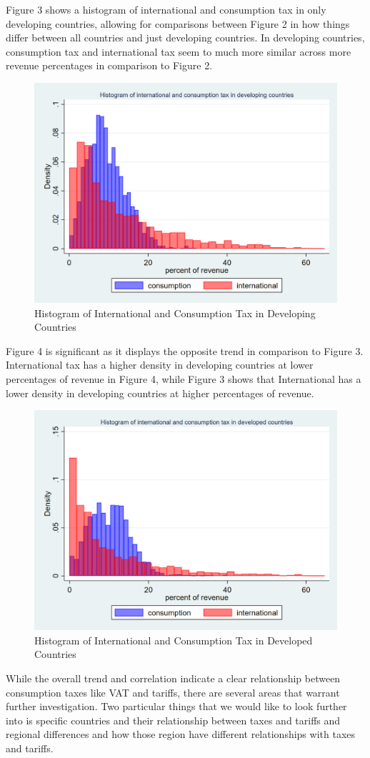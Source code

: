 \documentclass[12pt]{article}
\begin{document}
Figure 3 shows a histogram of international and consumption tax in only developing countries, allowing for comparisons between Figure 2 in how things differ between all countries and just developing countries. In developing countries, consumption tax and international tax seem to much more similar across more revenue percentages in comparison to Figure 2. 

\begin{figure}[h]
    \centering
    \includegraphics[width=0.5\linewidth]{Reproducibility_Package//png_files/twowayhistdevelopingintcons.png}
    \caption{Histogram of International and Consumption Tax in Developing Countries}
    \label{fig:enter-label}
\end{figure}

Figure 4 is significant as it displays the opposite trend in comparison to Figure 3. International tax has a higher density in developing countries at lower percentages of revenue in Figure 4, while Figure 3 shows that International has a lower density in developing countries at higher percentages of revenue. 

\begin{figure}[h]
    \centering
    \includegraphics[width=0.5\linewidth]{Reproducibility_Package//png_files/twowayhistdevelopedintcons.png}
    \caption{Histogram of International and Consumption Tax in Developed Countries}
    \label{fig:enter-label}
\end{figure}

While the overall trend and correlation indicate a clear relationship between consumption taxes like VAT and tariffs, there are several areas that warrant further investigation. Two particular things that we would like to look further into is specific countries and their relationship between taxes and tariffs and regional differences and how those region have different relationships with taxes and tariffs.
\end{document}
